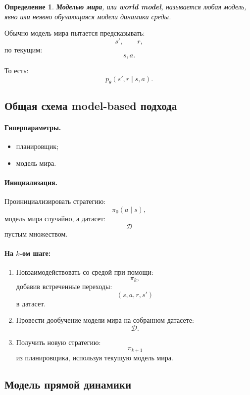 \documentclass[12pt,a4paper]{article}
\newtheorem{definition}{Определение}
\begin{document}
\begin{definition}
\textbf{Моделью мира}, или \textbf{world model}, называется любая модель, явно или неявно обучающаяся модели динамики среды.
\end{definition}

Обычно модель мира пытается предсказывать:
\[
s',
\qquad
r,
\]
по текущим:
\[
s,a.
\]

То есть:
\[
p_\theta(s',r\mid s,a).
\]

\subsection{Общая схема model-based подхода}

\paragraph{Гиперпараметры.}

\begin{itemize}
    \item планировщик;
    \item модель мира.
\end{itemize}

\paragraph{Инициализация.}

Проинициализировать стратегию:
\[
\pi_0(a\mid s),
\]
модель мира случайно, а датасет:
\[
\mathcal D
\]
пустым множеством.

\paragraph{На $k$-ом шаге:}

\begin{enumerate}
    \item Повзаимодействовать со средой при помощи:
    \[
    \pi_k,
    \]
    добавив встреченные переходы:
    \[
    (s,a,r,s')
    \]
    в датасет.

    \item Провести дообучение модели мира на собранном датасете:
    \[
    \mathcal D.
    \]

    \item Получить новую стратегию:
    \[
    \pi_{k+1}
    \]
    из планировщика, используя текущую модель мира.
\end{enumerate}

\subsection{Модель прямой динамики}
\end{document}

